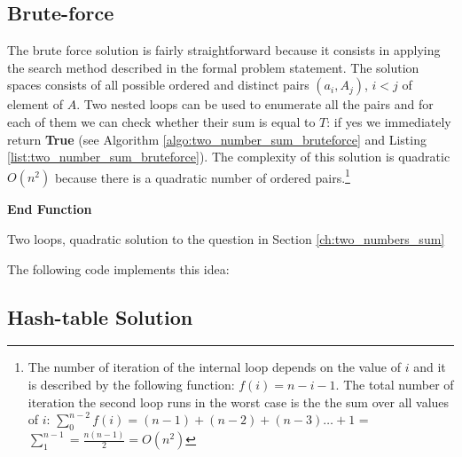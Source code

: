 \subsection{Brute-force}
The brute force solution is fairly straightforward because it consists in applying the search method described in the formal problem statement. The solution spaces consists of all possible ordered and distinct pairs $(a_i,A_j)$, $i < j$ of element of $A$. Two nested loops can be used to enumerate all the pairs and for each of them we can check whether their sum is equal to $T$: if yes we immediately return \textbf{True} (see Algorithm \ref{algo:two_number_sum_bruteforce} and Listing \ref{list:two_number_sum_bruteforce}).
The complexity of this solution is quadratic $O(n^2)$ because there is a quadratic number of ordered pairs.\footnote{The number of iteration of the internal loop depends on the value of $i$ and it is described by the following function: $f(i) = n-i-1$. The total number of iteration the second loop runs in the worst case is the the sum over all values of $i$: $\sum_{0}^{n-2}f(i) = (n-1) + (n-2) + (n-3) \dots + 1$ = $\sum_{1}^{n-1} = \frac{n(n-1)}{2} = O(n^2)$}
\begin{algorithm}
	\SetAlgoLined
	

	\textbf{End Function}
	
	\label{algo:two_number_sum_bruteforce}
	\caption{Two loops, quadratic solution to the question in Section \ref{ch:two_numbers_sum} }
\end{algorithm}
The following code implements this idea:


\subsection{Hash-table Solution}

